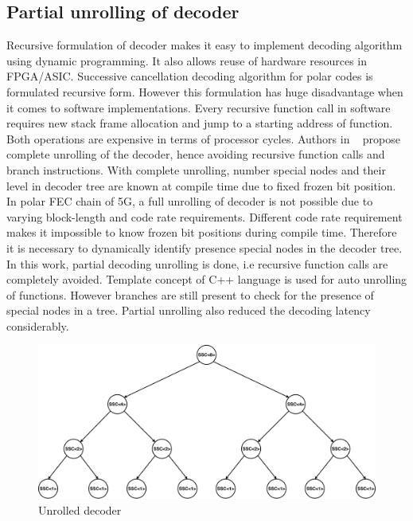 \subsection{Partial unrolling of decoder}
Recursive formulation of decoder makes it easy to implement  decoding algorithm using dynamic programming. It also allows reuse of hardware resources in FPGA/ASIC. Successive cancellation decoding algorithm for polar codes is formulated recursive form. However this formulation has huge disadvantage when it comes to software implementations. Every recursive function call in software requires new stack frame allocation and jump to a starting address of function. Both operations are expensive in terms of processor cycles. Authors in ~\cite{fastPolarDecodersAlgoImpl} propose complete unrolling of the decoder, hence avoiding recursive function calls and branch instructions. With complete unrolling, number special nodes and their level in decoder tree are known at compile time due to fixed frozen bit position. In polar FEC chain of 5G, a full unrolling of decoder is not possible due to varying block-length and code rate requirements. Different code rate requirement makes it impossible to know frozen bit positions during compile time. Therefore it is necessary to dynamically identify presence special nodes in the decoder tree. In this work, partial decoding unrolling is done, i.e recursive function calls are completely avoided. Template concept of C++ language is used for auto unrolling of functions. However branches are still present to check for the presence of special nodes in a tree. Partial unrolling also reduced the decoding latency considerably.

\begin{figure}[]
	\centering
	\includegraphics[width=1\textwidth]{./figures/unrolledDecoder.pdf}
	\caption{Unrolled decoder}
	\label{fig:unrolledDecoder}
\end{figure}

